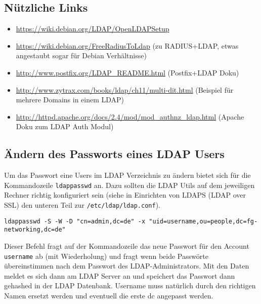 \subsection{Nützliche Links}
\begin{itemize}
\item \url{https://wiki.debian.org/LDAP/OpenLDAPSetup}
\item \url{https://wiki.debian.org/FreeRadiusToLdap} (zu RADIUS+LDAP, etwas angestaubt sogar für Debian Verhältnisse)
\item \url{http://www.postfix.org/LDAP\_README.html} (Postfix+LDAP Doku)
\item \url{http://www.zytrax.com/books/ldap/ch11/multi-dit.html} (Beispiel für mehrere Domains in einem LDAP)
\item \url{http://httpd.apache.org/docs/2.4/mod/mod\_authnz\_ldap.html} (Apache Doku zum LDAP Auth Modul)
\end{itemize}

\subsection{Ändern des Passworts eines LDAP Users}
Um das Passwort eine Users im LDAP Verzeichnis zu ändern bietet sich für die Kommandozeile \texttt{ldappasswd} an. Dazu sollten die LDAP Utils auf dem jeweiligen Rechner richtig konfiguriert sein (siehe in Einrichten von LDAPS (LDAP over SSL) den unteren Teil zur \texttt{/etc/ldap/ldap.conf}).
\begin{lstlisting}
ldappasswd -S -W -D "cn=admin,dc=de" -x "uid=username,ou=people,dc=fg-networking,dc=de"
\end{lstlisting}
Dieser Befehl fragt auf der Kommandozeile das neue Passwort für den Account \texttt{username} ab (mit Wiederholung) und fragt wenn beide Passwörte übereinstimmen nach dem Passwort des LDAP-Administrators. Mit den Daten meldet es sich dann am LDAP Server an und speichert das Passwort dann gehashed in der LDAP Datenbank. Username muss natürlich durch den richtigen Namen ersetzt werden und eventuell die erste dc angepasst werden.

